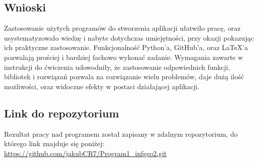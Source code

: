 \documentclass[10pt,a4paper]{article}
\begin{document}
\subsection{Wnioski}
Zastosowanie użytych programów do stworzenia aplikacji ułatwiło pracę, oraz usystematyzowało wiedzę i nabyte dotychczas umiejętności, przy okazji pokazując ich praktyczne zastosowanie. Funkcjonalność Python'a, GitHub'a, oraz LaTeX'a pozwalają prościej i bardziej fachowo wykonać zadanie. Wymagania zawarte w instrukcji do ćwiczenia udowodniły, że zastosowanie odpowiednich funkcji, bibliotek i rozwiązań pozwala na rozwiązanie wielu problemów, daje dużą ilość możliwości, oraz widoczne efekty w postaci działającej aplikacji.
\subsection{Link do repozytorium}
Rezultat pracy nad programem został zapisany w zdalnym repozytorium, do którego link znajduje się poniżej:
\newline
\url{https://github.com/jakubCR7/Program1_infgeo2.git}%
\end{document}
